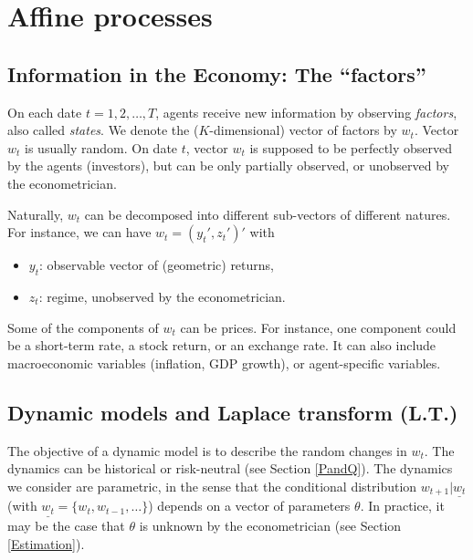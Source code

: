 \documentclass[
  12pt,
]{book}
\providecommand{\tightlist}{%
  \setlength{\itemsep}{0pt}\setlength{\parskip}{0pt}}
\theoremstyle{definition}
\theoremstyle{definition}
\theoremstyle{definition}
\theoremstyle{definition}
\theoremstyle{remark}
\begin{document}
\hypertarget{ChapterAffine}{%
\chapter{Affine processes}\label{ChapterAffine}}

\hypertarget{Information}{%
\section{Information in the Economy: The ``factors''}\label{Information}}

On each date \(t=1,2,\dots,T\), agents receive new information by observing \emph{factors}, also called \emph{states}. We denote the (\(K\)-dimensional) vector of factors by \(w_t\). Vector \(w_t\) is usually random. On date \(t\), vector \(w_t\) is supposed to be perfectly observed by the agents (investors), but can be only partially observed, or unobserved by the econometrician.

Naturally, \(w_t\) can be decomposed into different sub-vectors of different natures. For instance, we can have \(w_t = (y_t', z_t')'\) with

\begin{itemize}
\tightlist
\item
  \(y_t\): observable vector of (geometric) returns,
\item
  \(z_t\): regime, unobserved by the econometrician.
\end{itemize}

Some of the components of \(w_t\) can be prices. For instance, one component could be a short-term rate, a stock return, or an exchange rate. It can also include macroeconomic variables (inflation, GDP growth), or agent-specific variables.

\hypertarget{Dynamic}{%
\section{Dynamic models and Laplace transform (L.T.)}\label{Dynamic}}

The objective of a dynamic model is to describe the random changes in \(w_t\). The dynamics can be historical or risk-neutral (see Section \ref{PandQ}). The dynamics we consider are parametric, in the sense that the conditional distribution \(w_{t+1}|\underline{w_t}\) (with \(\underline{w_t}=\{w_t,w_{t-1},\dots\}\)) depends on a vector of parameters \(\theta\). In practice, it may be the case that \(\theta\) is unknown by the econometrician (see Section \ref{Estimation}).
\end{document}
